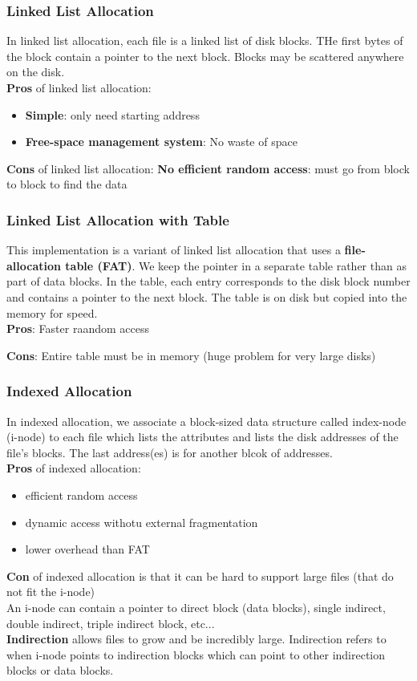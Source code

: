 \documentclass{article}
\newcommand{\bold}[1]{\textbf{#1}}
\renewcommand{\b}{\item[$\circ$]}
\newcommand{\newlist}{\begin{itemize}}
\renewcommand{\endlist}{\end{itemize}}
\begin{document}
\subsubsection{Linked List Allocation}

In linked list allocation, each file is a linked list of disk blocks. THe first bytes of the block contain a pointer to the next block. Blocks may be scattered anywhere on the disk. \\

\bold{Pros} of linked list allocation:

\newlist 
\b \bold{Simple}: only need starting address
\b \bold{Free-space management system}: No waste of space
\endlist

\bold{Cons} of linked list allocation: \bold{No efficient random access}: must go from block to block to find the data

\subsubsection{Linked List Allocation with Table}

This implementation is a variant of linked list allocation that uses a \bold{file-allocation table (FAT)}. We keep the pointer in a separate table rather than as part of data blocks. In the table, each entry corresponds to the disk block number and contains a pointer to the next block. The table is on disk but copied into the memory for speed. \\ 

\bold{Pros}: Faster raandom access

\bold{Cons}: Entire table must be in memory (huge problem for very large disks)

\subsubsection{Indexed Allocation}

In indexed allocation, we associate a block-sized data structure called index-node (i-node) to each file which lists the attributes and lists the disk addresses of the file's blocks. The last address(es) is for another blcok of addresses. \\

\bold{Pros} of indexed allocation:

\newlist 
\b efficient random access
\b dynamic access withotu external fragmentation
\b lower overhead than FAT
\endlist

\bold{Con} of indexed allocation is that it can be hard to support large files (that do not fit the i-node) \\ 

An i-node can contain a pointer to direct block (data blocks), single indirect, double indirect, triple indirect block, etc... \\ 

\bold{Indirection} allows files to grow and be incredibly large. Indirection refers to when i-node points to indirection blocks which can point to other indirection blocks or data blocks. 
\end{document}
